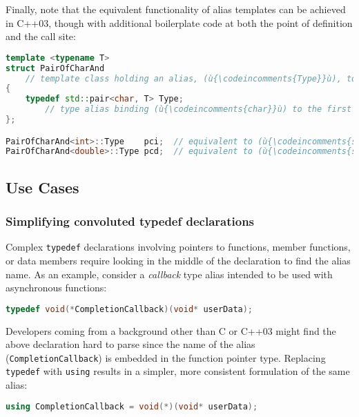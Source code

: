 \noindent Finally, note that the equivalent functionality of alias templates can be
achieved in C++03, though with additional boilerplate code at both the
point of definition and the call site:

\begin{lstlisting}[language=C++]
template <typename T>
struct PairOfCharAnd
    // template class holding an alias, (ù{\codeincomments{Type}}ù), to (ù{\codeincomments{std::pair<char, T>}}ù)
{
    typedef std::pair<char, T> Type;
        // type alias binding (ù{\codeincomments{char}}ù) to the first type parameter of (ù{\codeincomments{std::pair}}ù)
};

PairOfCharAnd<int>::Type    pci;  // equivalent to (ù{\codeincomments{std::pair<char, int> pci;}}ù)
PairOfCharAnd<double>::Type pcd;  // equivalent to (ù{\codeincomments{std::pair<char, double> pcd;}}ù)
\end{lstlisting}


\subsection[Use Cases]{Use Cases}\label{use-cases}

\subsubsection[Simplifying convoluted {\tt typedef} declarations]{Simplifying convoluted {\SubsubsecCode typedef} declarations}\label{simplifying-convoluted-typedef-declarations}

Complex \texttt{typedef} declarations involving pointers to functions,
member functions, or data members require looking in the middle of the
declaration to find the alias name. As an example, consider a
\emph{callback} type alias intended to be used with asynchronous functions:

\begin{lstlisting}[language=C++]
typedef void(*CompletionCallback)(void* userData);
\end{lstlisting}

\noindent Developers coming from a background other than C or C++03 might find the
above declaration hard to parse since the name of the alias
(\texttt{CompletionCallback}) is embedded in the function pointer type.
Replacing \texttt{typedef} with \texttt{using} results in a simpler,
more consistent formulation of the same alias:

\begin{lstlisting}[language=C++]
using CompletionCallback = void(*)(void* userData);
\end{lstlisting}

